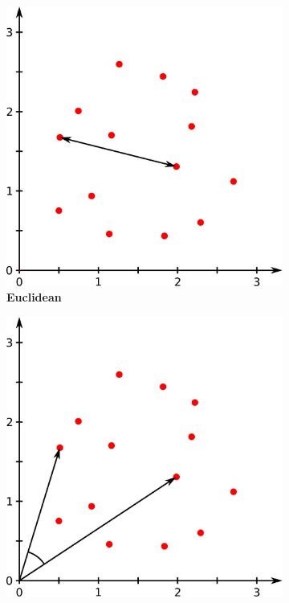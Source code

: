 \begin{figure}
    \begin{adjustbox}{minipage=\dimexpr{}\fboxrule,fbox}
        \begin{subfigure}[b]{0.475\textwidth}
            \includegraphics[width=\textwidth]{Extra_Graphics/Euclidean.pdf}
            \caption[Euclidean]{\textbf{Euclidean}}
            \label{fig:1.0.2a}
        \end{subfigure}
        \hfill
        \begin{subfigure}[b]{0.475\textwidth}
            \includegraphics[width=\textwidth]{Extra_Graphics/Cosinus.pdf}

\end{subfigure}
\end{adjustbox}
\end{figure}
